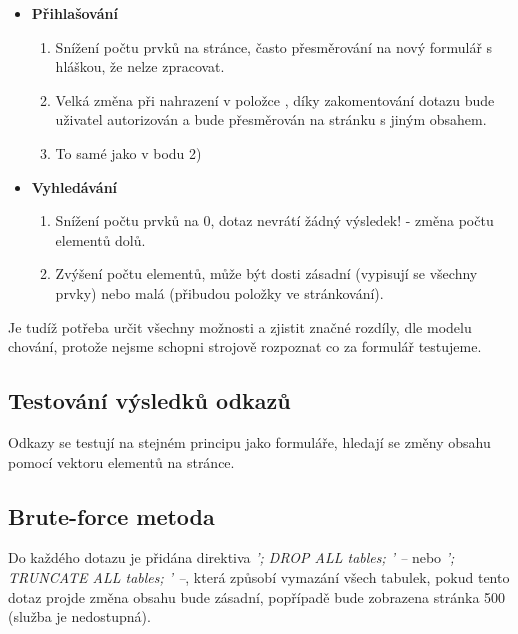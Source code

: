 \documentclass[12pt, a4paper]{report}
\begin{document}
\begin{itemize}
\item \textbf{Přihlašování}
\begin{enumerate}
\item Snížení počtu prvků na stránce, často přesměrování na nový formulář s hláškou, že nelze zpracovat.
\item Velká změna při nahrazení v položce , díky zakomentování dotazu bude uživatel autorizován a bude přesměrován na stránku s jiným obsahem.
\item To samé jako v bodu 2)
\end{enumerate}
\item \textbf{Vyhledávání}
\begin{enumerate}
\item Snížení počtu prvků na 0, dotaz nevrátí žádný výsledek! - změna počtu elementů dolů.
\item Zvýšení počtu elementů, může být dosti zásadní (vypisují se všechny prvky) nebo malá (přibudou položky ve stránkování).
\end{enumerate}
\end{itemize}
Je tudíž potřeba určit všechny možnosti a zjistit značné rozdíly, dle modelu chování, protože nejsme schopni strojově rozpoznat co za formulář testujeme.

\subsection{Testování výsledků odkazů}
Odkazy se testují na stejném principu jako formuláře, hledají se změny obsahu pomocí vektoru elementů na stránce.

\subsection{Brute-force metoda}
Do každého dotazu je přidána direktiva \textit{'; DROP ALL tables; ' --} nebo \textit{'; TRUNCATE ALL tables; ' --}, která způsobí vymazání všech tabulek, pokud tento dotaz projde změna obsahu bude zásadní, popřípadě bude zobrazena stránka 500 (služba je nedostupná).


\end{document}

